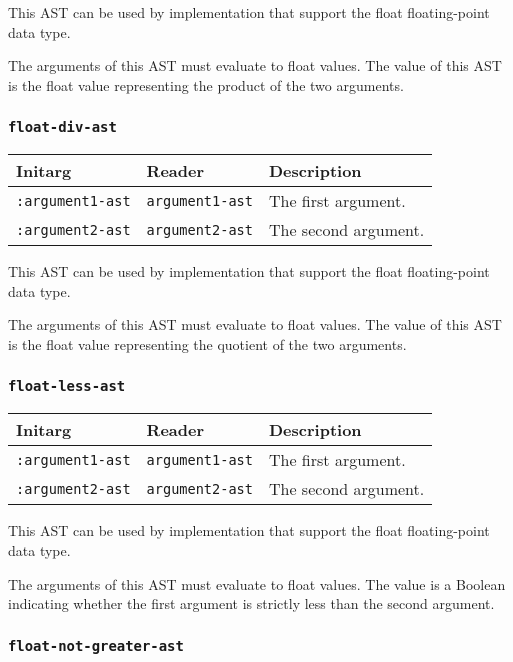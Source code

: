 This AST can be used by implementation that support the float
floating-point data type.  

The arguments of this AST must evaluate to float
values.  The value of this AST is the float value
representing the product of the two arguments.

\subsubsection{\texttt{float-div-ast}}
\label{sec-ast-float-div}

\begin{tabular}{|l|l|l|}
\hline
Initarg & Reader & Description\\
\hline\hline
\texttt{:argument1-ast} & \texttt{argument1-ast} & The first argument.\\
\hline
\texttt{:argument2-ast} & \texttt{argument2-ast} & The second argument.\\
\hline
\end{tabular}

This AST can be used by implementation that support the float
floating-point data type.  

The arguments of this AST must evaluate to float
values.  The value of this AST is the float value
representing the quotient of the two arguments.

\subsubsection{\texttt{float-less-ast}}
\label{sec-ast-float-less}

\begin{tabular}{|l|l|l|}
\hline
Initarg & Reader & Description\\
\hline\hline
\texttt{:argument1-ast} & \texttt{argument1-ast} & The first argument.\\
\hline
\texttt{:argument2-ast} & \texttt{argument2-ast} & The second argument.\\
\hline
\end{tabular}

This AST can be used by implementation that support the float
floating-point data type.  

The arguments of this AST must evaluate to float
values.  The value is a Boolean indicating whether the first argument
is strictly less than the second argument.

\subsubsection{\texttt{float-not-greater-ast}}
\label{sec-ast-float-not-greater}

